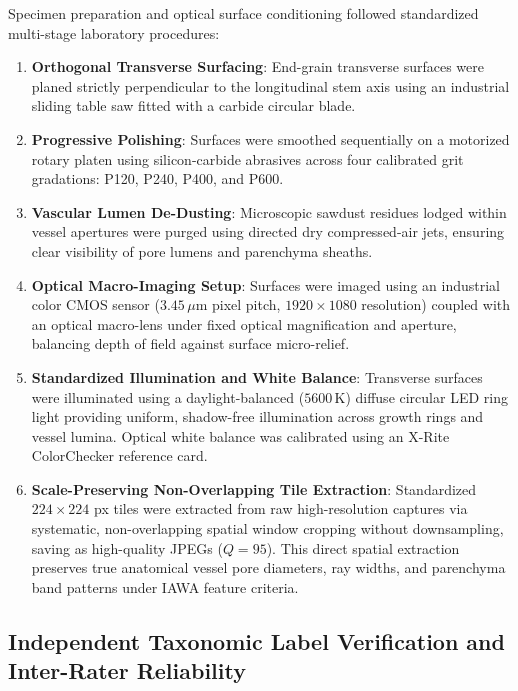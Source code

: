\documentclass[a4paper,fleqn,12pt]{cas-sc}
\begin{document}
Specimen preparation and optical surface conditioning followed standardized multi-stage laboratory procedures:
\begin{enumerate}[leftmargin=*,itemsep=2pt,topsep=2pt]
    \item \textbf{Orthogonal Transverse Surfacing}: End-grain transverse surfaces were planed strictly perpendicular to the longitudinal stem axis using an industrial sliding table saw fitted with a carbide circular blade.
    \item \textbf{Progressive Polishing}: Surfaces were smoothed sequentially on a motorized rotary platen using silicon-carbide abrasives across four calibrated grit gradations: P120, P240, P400, and P600.
    \item \textbf{Vascular Lumen De-Dusting}: Microscopic sawdust residues lodged within vessel apertures were purged using directed dry compressed-air jets, ensuring clear visibility of pore lumens and parenchyma sheaths.
    \item \textbf{Optical Macro-Imaging Setup}: Surfaces were imaged using an industrial color CMOS sensor ($3.45\,\mu\text{m}$ pixel pitch, $1920 \times 1080$ resolution) coupled with an optical macro-lens under fixed optical magnification and aperture, balancing depth of field against surface micro-relief.
    \item \textbf{Standardized Illumination and White Balance}: Transverse surfaces were illuminated using a daylight-balanced ($5600\,\text{K}$) diffuse circular LED ring light providing uniform, shadow-free illumination across growth rings and vessel lumina. Optical white balance was calibrated using an X-Rite ColorChecker reference card.
    \item \textbf{Scale-Preserving Non-Overlapping Tile Extraction}: Standardized $224 \times 224$ px tiles were extracted from raw high-resolution captures via systematic, non-overlapping spatial window cropping without downsampling, saving as high-quality JPEGs ($Q=95$). This direct spatial extraction preserves true anatomical vessel pore diameters, ray widths, and parenchyma band patterns under IAWA feature criteria.
\end{enumerate}

\subsection{Independent Taxonomic Label Verification and Inter-Rater Reliability}
\label{sec:inter_rater}
\end{document}
